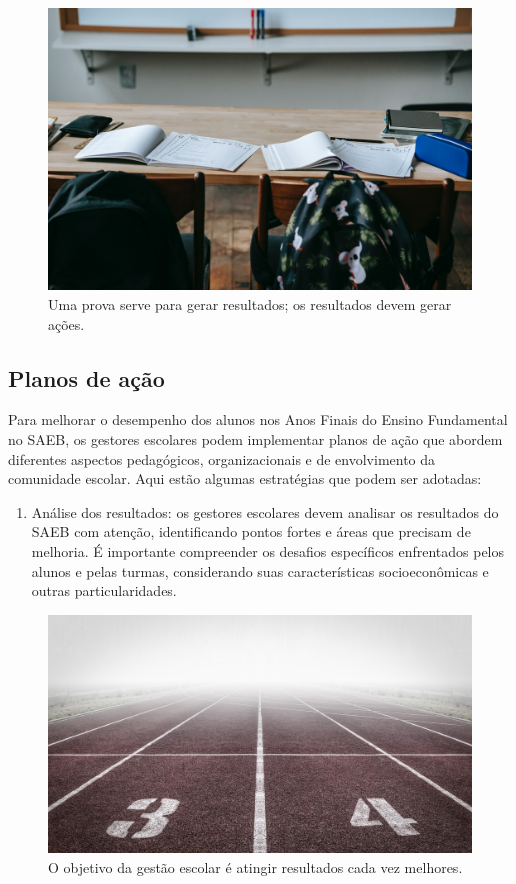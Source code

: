 \begin{figure}
\centering
\includegraphics[width=\textwidth]{./imgs/Imagem005.jpg}
\caption{Uma prova serve para gerar resultados; os resultados devem
gerar ações.}
\end{figure}

\subsection{Planos de ação}\label{planos-de-auxe7uxe3o}

Para melhorar o desempenho dos alunos nos Anos Finais do Ensino
Fundamental no SAEB, os gestores escolares podem implementar planos de
ação que abordem diferentes aspectos pedagógicos, organizacionais e de
envolvimento da comunidade escolar. Aqui estão algumas estratégias que
podem ser adotadas:

\begin{enumerate}
\def\labelenumi{\arabic{enumi}.}
\tightlist
\item
  Análise dos resultados: os gestores escolares devem analisar os
  resultados do SAEB com atenção, identificando pontos fortes e áreas
  que precisam de melhoria. É importante compreender os desafios
  específicos enfrentados pelos alunos e pelas turmas, considerando suas
  características socioeconômicas e outras particularidades.
\end{enumerate}

\begin{figure}
\centering
\includegraphics[width=\textwidth]{./imgs/Imagem006.jpg}
\caption{O objetivo da gestão escolar é atingir resultados cada vez
melhores.}
\end{figure}

